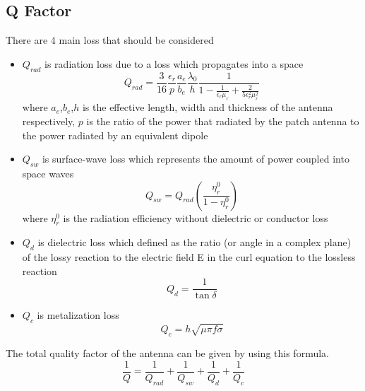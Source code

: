 \documentclass[11pt,a4paper]{article}
\begin{document}
    \subsection{Q Factor}
    \indent There are 4 main loss that should be considered\cite{NoK:05}
      \begin{itemize}
        \item $Q_{rad}$ is radiation loss due to a loss which propagates into a space
          \begin{equation}
              Q_{rad} = \frac{3}{16}\frac{\epsilon_r}{p}\frac{a_e}{b_e}\frac{\lambda_0}{h}\frac{1}{1-\frac{1}{\epsilon_r\mu_r}+\frac{2}{5\epsilon_r^2\mu_{r}^2}}
          \end{equation}
          \indent where $a_e$,$b_e$,$h$ is the effective length, width and thickness of the antenna respectively,
           $p$ is the ratio of the power that radiated by the patch antenna to the power radiated by an equivalent dipole\cite{NoK:05}
        \item $Q_{sw}$ is surface-wave loss which represents the amount of power coupled into space waves
          \begin{equation}
            Q_{sw} = Q_{rad}(\frac{\eta_r^0}{1-\eta_r^0})
          \end{equation}
          \indent where $\eta_r^0$ is the radiation efficiency without dielectric or conductor loss
        \item $Q_d$ is dielectric loss which defined as the ratio (or angle in a complex plane) of the lossy reaction to the electric field E in the curl equation to the lossless reaction
          \begin{equation}
            Q_d = \frac{1}{\tan\delta}
          \end{equation}
        \item $Q_c$ is metalization loss
        \begin{equation}
          Q_c = h\sqrt{\mu\pi{f}\sigma}
        \end{equation}
      \end{itemize}
    \indent The total quality factor of the antenna can be given by using this formula.
      \begin{equation}
        \frac{1}{Q} = \frac{1}{Q_{rad}} + \frac{1}{Q_{sw}} + \frac{1}{Q_d} + \frac{1}{Q_c}
      \end{equation}
\end{document}
